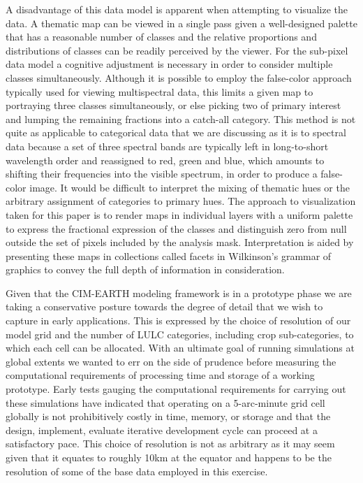 A disadvantage of this data model is apparent when attempting to
visualize the data.  A thematic map can be viewed in a single pass
given a well-designed palette that has a reasonable number of classes
and the relative proportions and distributions of classes can be
readily perceived by the viewer.  For the sub-pixel data model a
cognitive adjustment is necessary in order to consider multiple
classes simultaneously.  Although it is possible to employ the
false-color approach typically used for viewing multispectral data,
this limits a given map to portraying three classes simultaneously, or
else picking two of primary interest and lumping the remaining
fractions into a catch-all category.  This method is not quite as
applicable to categorical data that we are discussing as it is to
spectral data because a set of three spectral bands are typically left
in long-to-short wavelength order and reassigned to red, green and
blue, which amounts to shifting their frequencies into the visible
spectrum, in order to produce a false-color image.  It would be
difficult to interpret the mixing of thematic hues or the arbitrary
assignment of categories to primary hues.  The approach to
visualization taken for this paper is to render maps in individual
layers with a uniform palette to express the fractional expression of
the classes and distinguish zero from null outside the set of pixels
included by the analysis mask.  Interpretation is aided by presenting
these maps in collections called facets in Wilkinson's
\citeyearpar{Wilkinson2005} grammar of graphics to convey the full
depth of information in consideration.

Given that the CIM-EARTH modeling framework is in a prototype phase we
are taking a conservative posture towards the degree of detail that we
wish to capture in early applications.  This is expressed by the
choice of resolution of our model grid and the number of LULC
categories, including crop sub-categories, to which each cell can be
allocated.  With an ultimate goal of running simulations at global
extents we wanted to err on the side of prudence before measuring the
computational requirements of processing time and storage of a working
prototype.  Early tests gauging the computational requirements for
carrying out these simulations have indicated that operating on a
5-arc-minute grid cell globally is not prohibitively costly in time,
memory, or storage and that the design, implement, evaluate iterative
development cycle can proceed at a satisfactory pace.  This choice of
resolution is not as arbitrary as it may seem given that it equates to
roughly 10km at the equator and happens to be the resolution of some
of the base data employed in this exercise.

